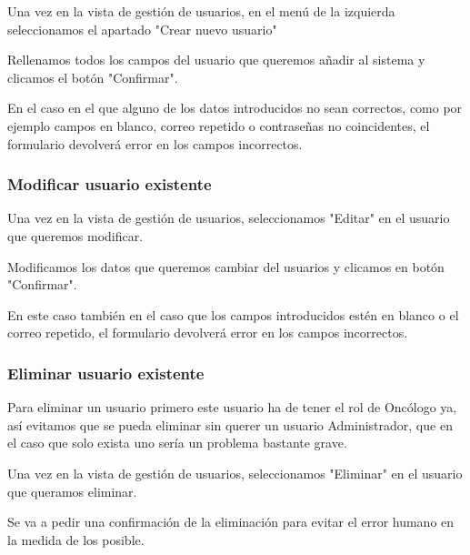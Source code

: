Una vez en la vista de gestión de usuarios, en el menú de la izquierda seleccionamos el apartado "{}Crear nuevo usuario"


Rellenamos todos los campos del usuario que queremos añadir al sistema y clicamos el botón "{}Confirmar".  


En el caso en el que alguno de los datos introducidos no sean correctos, como por ejemplo campos en blanco, correo repetido o contraseñas no coincidentes, el formulario devolverá error en los campos incorrectos.

\subsubsection{Modificar usuario existente}

Una vez en la vista de gestión de usuarios, seleccionamos "{}Editar"{} en el usuario que queremos modificar. 


Modificamos los datos que queremos cambiar del usuarios y clicamos en botón "{}Confirmar".


En este caso también en el caso que los campos introducidos estén en blanco o el correo repetido, el formulario devolverá error en los campos incorrectos.

\subsubsection{Eliminar usuario existente}

Para eliminar un usuario primero este usuario ha de tener el rol de Oncólogo ya, así evitamos que se pueda eliminar sin querer un usuario Administrador, que en el caso que solo exista uno sería un problema bastante grave.

Una vez en la vista de gestión de usuarios, seleccionamos "Eliminar" en el usuario que queramos eliminar.


Se va a pedir una confirmación de la eliminación para evitar el error humano en la medida de los posible.


